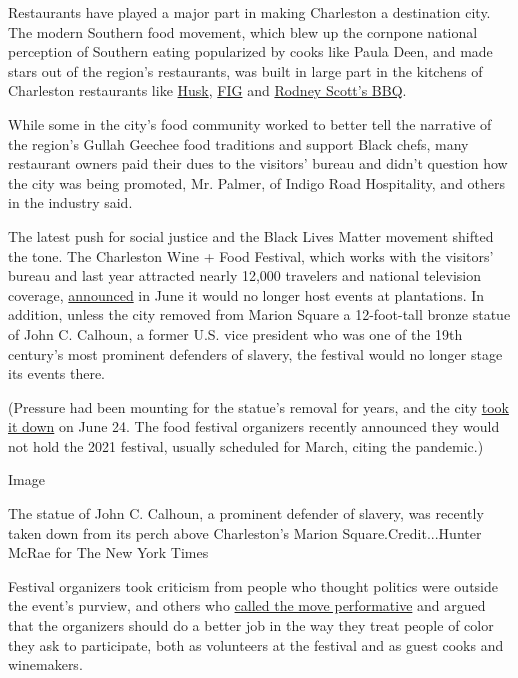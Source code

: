 Restaurants have played a major part in making Charleston a destination
city. The modern Southern food movement, which blew up the cornpone
national perception of Southern eating popularized by cooks like Paula
Deen, and made stars out of the region's restaurants, was built in large
part in the kitchens of Charleston restaurants like
\href{https://www.nytimes3xbfgragh.onion/2011/02/09/dining/09notebook.html}{Husk},
\href{https://carolinas.eater.com/2018/11/13/18091704/berthas-and-fig-38-essential-restaurants}{FIG}
and
\href{https://www.charlotteobserver.com/living/food-drink/article210780499.html}{Rodney
Scott's BBQ}.

While some in the city's food community worked to better tell the
narrative of the region's Gullah Geechee food traditions and support
Black chefs, many restaurant owners paid their dues to the visitors'
bureau and didn't question how the city was being promoted, Mr. Palmer,
of Indigo Road Hospitality, and others in the industry said.

The latest push for social justice and the Black Lives Matter movement
shifted the tone. The Charleston Wine + Food Festival, which works with
the visitors' bureau and last year attracted nearly 12,000 travelers and
national television coverage,
\href{https://www.instagram.com/p/CBgMUP-D_34/}{announced} in June it
would no longer host events at plantations. In addition, unless the city
removed from Marion Square a 12-foot-tall bronze statue of John C.
Calhoun, a former U.S. vice president who was one of the 19th century's
most prominent defenders of slavery, the festival would no longer stage
its events there.

(Pressure had been mounting for the statue's removal for years, and the
city
\href{https://www.cnn.com/2020/06/24/us/charleston-statue-removal-calhoun-trnd/index.html}{took
it down} on June 24. The food festival organizers recently announced
they would not hold the 2021 festival, usually scheduled for March,
citing the pandemic.)

Image

The statue of John C. Calhoun, a prominent defender of slavery, was
recently taken down from its perch above Charleston's Marion
Square.Credit...Hunter McRae for The New York Times

Festival organizers took criticism from people who thought politics were
outside the event's purview, and others who
\href{https://www.postandcourier.com/blog/raskin_around/charleston-wine-food-festival-blasted-by-activists-for-taking-easiest-stance-on-racism/article_cc7bdd44-b017-11ea-9cd1-230f31744846.html}{called
the move performative} and argued that the organizers should do a better
job in the way they treat people of color they ask to participate, both
as volunteers at the festival and as guest cooks and winemakers.

